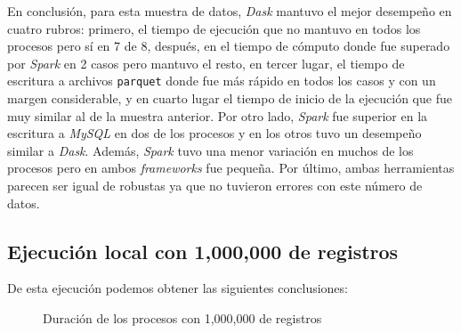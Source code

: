 En conclusión, para esta muestra de datos, \textit{Dask} mantuvo el mejor desempeño en cuatro rubros: primero, el tiempo de ejecución que no mantuvo en todos los procesos pero sí en 7 de 8, después, en el tiempo de cómputo donde fue superado por \textit{Spark} en 2 casos pero mantuvo el resto, en tercer lugar, el tiempo de escritura a archivos \texttt{parquet} donde fue más rápido en todos los casos y con un margen considerable, y en cuarto lugar el tiempo de inicio de la ejecución que fue muy similar al de la muestra anterior. Por otro lado, \textit{Spark} fue superior en la escritura a \textit{MySQL} en dos de los procesos y en los otros tuvo un desempeño similar a \textit{Dask}. Además, \textit{Spark} tuvo una menor variación en muchos de los procesos pero en ambos \textit{frameworks} fue pequeña. Por último, ambas herramientas parecen ser igual de robustas ya que no tuvieron errores con este número de datos. 


\subsection{Ejecución local con 1,000,000 de registros}

De esta ejecución podemos obtener las siguientes conclusiones:

\begin{center}
\begin{figure}
\caption{Duración de los procesos con 1,000,000 de registros}
\label{barras:duracion1M}
\end{figure}
\end{center}

